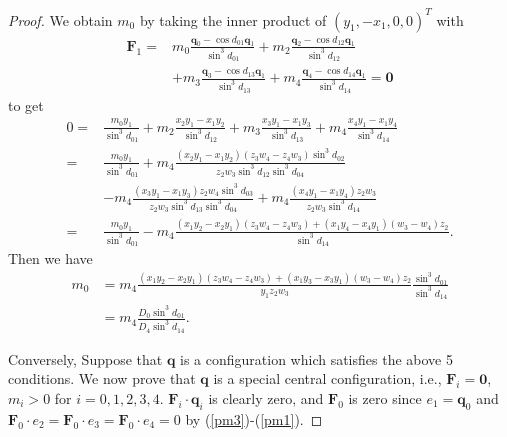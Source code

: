 \documentclass[12pt]{amsart}
\theoremstyle{definition}
\newcommand {\q} {\mathbf{q}}
\newcommand {\F} {\mathbf{F}}
\begin{document}
{\begin{proof}
We obtain $m_0$ by taking the inner product of $(y_1,-x_1,0,0)^T$ with \begin{align*}\F_1=&m_0\frac{\q_0-\cos{d_{01}}\q_1}{\sin^3{d_{01}}}+m_2\frac{\q_2-\cos{d_{12}}\q_1}{\sin^3{d_{12}}}\\
&+m_3\frac{\q_3-\cos{d_{13}}\q_1}{\sin^3{d_{13}}}+m_4\frac{\q_4-\cos{d_{14}}\q_1}{\sin^3{d_{14}}}=\mathbf{0}\end{align*}
to get \begin{align*}
0=&\frac{m_0y_1}{\sin^3{d_{01}}}+m_2\frac{x_2y_1-x_1y_2}{\sin^3{d_{12}}}+m_3\frac{x_3y_1-x_1y_3}{\sin^3{d_{13}}}+m_4\frac{x_4y_1-x_1y_4}{\sin^3{d_{14}}}\\
=&\frac{m_0y_1}{\sin^3{d_{01}}}+m_4\frac{(x_2y_1-x_1y_2)(z_3w_4-z_4w_3)\sin^3{d_{02}}}{z_2w_3\sin^3{d_{12}}\sin^3{d_{04}}}\\
&-m_4\frac{(x_3y_1-x_1y_3)z_2w_4\sin^3{d_{03}}}{z_2w_3\sin^3{d_{13}}\sin^3{d_{04}}}+m_4\frac{(x_4y_1-x_1y_4)z_2w_3}{z_2w_3\sin^3{d_{14}}}\\
=&\frac{m_0y_1}{\sin^3{d_{01}}}-m_4\frac{(x_1y_2-x_2y_1)(z_3w_4-z_4w_3)+(x_1y_4-x_4y_1)(w_3-w_4)z_2}{\sin^3{d_{14}}}.\end{align*}
Then we have \begin{align}
\label{pm0}m_0&=m_4\frac{(x_1y_2-x_2y_1)(z_3w_4-z_4w_3)+(x_1y_3-x_3y_1)(w_3-w_4)z_2}{y_1z_2w_3}\frac{\sin^3{d_{01}}}{\sin^3{d_{14}}}\\
\nonumber&=m_4\frac{D_0\sin^3{d_{01}}}{D_4\sin^3{d_{14}}}.\end{align}
\medskip

Conversely, Suppose that $\q$ is a configuration which satisfies the above 5 conditions. We now prove that $\q$ is a special central configuration, i.e., $\F_i=\mathbf{0}$, $m_i>0$ for $i=0,1,2,3,4$. $\F_i \cdot \q_i$ is clearly zero, and $\F_0$ is zero since $e_1=\q_0$ and $\F_0\cdot e_2=\F_0\cdot e_3=\F_0\cdot e_4=0$ by (\ref{pm3})-(\ref{pm1}).
\smallskip


\end{proof}}
\end{document}
